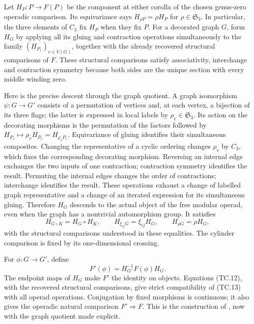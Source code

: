 Let $H_P:P\longrightarrow F(P)$ be the component at either corolla
of the chosen genus-zero operadic comparison.  Its equivariance says
$H_{\rho P}=\rho H_P$ for $\rho\in\mathfrak S_3$.
In particular, the three elements of $C_3$ fix $H_P$ when they fix
$P$.  For a decorated graph $G$, form $H_G$ by applying all its
gluing and contraction operations simultaneously to the family
$(H_{P_v})_{v\in V(G)}$, together with the already recovered
structural comparisons of $F$.  These structural comparisons
satisfy associativity, interchange and contraction symmetry because
both sides are the unique section with every middle winding zero.

Here is the precise descent through the graph quotient.  A graph
isomorphism $\psi:G\longrightarrow G'$ consists of a permutation
of vertices and, at each vertex, a bijection of its three flags;
the latter is expressed in local labels by
$\rho_v\in\mathfrak S_3$.  Its action on the decorating morphisms
is the permutation of the factors followed by
$H_{P_v}\mapsto \rho_v H_{P_v}=H_{\rho_vP_v}$.
Equivariance of gluing identifies their simultaneous composites.
Changing the representative of a cyclic ordering changes
$\rho_v$ by $C_3$, which fixes the corresponding decorating
morphism.  Reversing an internal edge exchanges the two inputs
of one contraction; contraction symmetry identifies the result.
Permuting the internal edges changes the order of contractions;
interchange identifies the result.  These operations exhaust a
change of labelled graph representative and a change of an
iterated expression for its simultaneous gluing.  Therefore $H_G$
descends to the actual object of the free modular operad, even
when the graph has a nontrivial automorphism group.  It satisfies
\[
 H_{G\circ K}=H_G\circ H_K,\qquad
 H_{\xi_{ij}G}=\xi_{ij}H_G,\qquad
 H_{\rho G}=\rho H_G,
                                                               \tag{TC.12}
\]
with the structural comparisons understood in these equalities.
The cylinder comparison is fixed by its one-dimensional crossing.

For $\phi:G\to G'$, define
\[
                F'(\phi)=H_{G'}^{-1}F(\phi)H_G.
                                                               \tag{TC.13}
\]
The endpoint maps of $H_G$ make $F'$ the identity on objects.
Equations (TC.12), with the recovered structural comparisons,
give strict compatibility of (TC.13) with all operad operations.
Conjugation by fixed morphisms is continuous; it also gives the
operadic natural comparison $F'\Rightarrow F$.
This is the construction of
\cite[Lemma~6.11]{ET_BonattoRobertson2026}, now with the graph
quotient made explicit.

